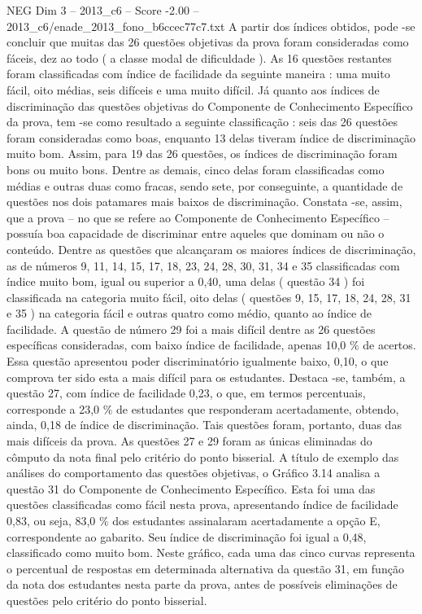 \begin{textsample}{NEG Dim 3 – 2013\_c6 – Score -2.00 – 2013\_c6/enade\_2013\_fono\_b6ccec77c7.txt}
A partir dos índices obtidos, pode -se concluir que muitas das 26 questões objetivas da prova foram consideradas como fáceis, dez ao todo ( a classe modal de dificuldade ).
As 16 questões restantes foram classificadas com índice de facilidade da seguinte maneira : uma muito fácil, oito médias, seis difíceis e uma muito difícil.
Já quanto aos índices de discriminação das questões objetivas do Componente de Conhecimento Específico da prova, tem -se como resultado a seguinte classificação : seis das 26 questões foram consideradas como boas, enquanto 13 delas tiveram índice de discriminação muito bom.
Assim, para 19 das 26 questões, os índices de discriminação foram bons ou muito bons.
Dentre as demais, cinco delas foram classificadas como médias e outras duas como fracas, sendo sete, por conseguinte, a quantidade de questões nos dois patamares mais baixos de discriminação.
Constata -se, assim, que a prova – no que se refere ao Componente de Conhecimento Específico – possuía boa capacidade de discriminar entre aqueles que dominam ou não o conteúdo.
Dentre as questões que alcançaram os maiores índices de discriminação, as de números 9, 11, 14, 15, 17, 18, 23, 24, 28, 30, 31, 34 e 35 classificadas com índice muito bom, igual ou superior a 0,40, uma delas ( questão 34 ) foi classificada na categoria muito fácil, oito delas ( questões 9, 15, 17, 18, 24, 28, 31 e 35 ) na categoria fácil e outras quatro como médio, quanto ao índice de facilidade.
A questão de número 29 foi a mais difícil dentre as 26 questões específicas consideradas, com baixo índice de facilidade, apenas 10,0 \% de acertos.
Essa questão apresentou poder discriminatório igualmente baixo, 0,10, o que comprova ter sido esta a mais difícil para os estudantes.
Destaca -se, também, a questão 27, com índice de facilidade 0,23, o que, em termos percentuais, corresponde a 23,0 \% de estudantes que responderam acertadamente, obtendo, ainda, 0,18 de índice de discriminação.
Tais questões foram, portanto, duas das mais difíceis da prova.
As questões 27 e 29 foram as únicas eliminadas do cômputo da nota final pelo critério do ponto bisserial.
A título de exemplo das análises do comportamento das questões objetivas, o Gráfico 3.14 analisa a questão 31 do Componente de Conhecimento Específico.
Esta foi uma das questões classificadas como fácil nesta prova, apresentando índice de facilidade 0,83, ou seja, 83,0 \% dos estudantes assinalaram acertadamente a opção E, correspondente ao gabarito.
Seu índice de discriminação foi igual a 0,48, classificado como muito bom.
Neste gráfico, cada uma das cinco curvas representa o percentual de respostas em determinada alternativa da questão 31, em função da nota dos estudantes nesta parte da prova, antes de possíveis eliminações de questões pelo critério do ponto bisserial.

\end{textsample}
